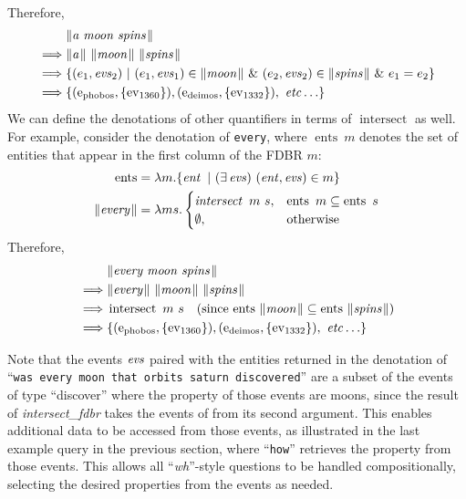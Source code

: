 \documentclass[../main.tex]{subfiles}
\begin{document}
\begin{refsection}
\begin{equation*}
\begin{split}
	\end{split}
\end{equation*}
Therefore,
\begin{equation*}
	\begin{split}
		&\meaningof{a\ moon\ spins} \\
		\implies & \meaningof{a}\ \meaningof{moon}\ \meaningof{spins} \\
		\implies & \{(e_1,\evs_2)\ |\ (e_1,\evs_1) \in \meaningof{moon}\ \&\ (e_2,\evs_2) \in \meaningof{spins}\ \&\ e_1 = e_2\} \\
		\implies & \{(\entityassoc{phobos}, \{\eventassoc{1360}\}), (\entityassoc{deimos}, \{\eventassoc{1332}\}),\ \etc\}
	\end{split}
\end{equation*}
We can define the denotations of other quantifiers in terms of $\operatorname{intersect}$ as well.  For example, consider the denotation of \texttt{every}, where $\operatorname{ents}\ m$ denotes the set of entities that appear in the first column of the FDBR $m$:
\begin{equation*}
	\begin{split}
		\operatorname{ents} &= \lambda m.\{ \operatorname{\mathit{ent}}\ |\ (\exists \operatorname{\mathit{evs}})\ (\operatorname{\mathit{ent}}, \operatorname{\mathit{evs}}) \in m \} \\
		\lVert\textit{every\hspace{0.1em}}\rVert &= \lambda ms.
		\begin{cases}
			\operatorname{\mathit{intersect}}\ m\ s, & \operatorname{ents}\ m \subseteq \operatorname{ents}\ s \\
			\emptyset, & \text{otherwise}
		\end{cases}
	\end{split}
\end{equation*}
Therefore,
\begin{equation*}
	\begin{split}
		&\meaningof{every moon spins} \\
		\implies & \meaningof{every}\ \meaningof{moon}\ \meaningof{spins} \\
		\implies & \operatorname{intersect}\ m\ s\quad\dmathrm{(since $\operatorname{ents}\ \meaningof{moon} \subseteq \operatorname{ents}\ \meaningof{spins}$)} \\
		\implies & \{(\entityassoc{phobos}, \{\eventassoc{1360}\}), (\entityassoc{deimos}, \{\eventassoc{1332}\}),\ \etc\}
	\end{split}
\end{equation*}

\noindent Note that the events $\operatorname{\mathit{evs}}$ paired with the entities returned in the denotation of ``\texttt{was every moon that orbits saturn discovered}'' are a subset of the events of type ``discover'' where the  property of those events are moons, since the result of \textit{intersect\_fdbr} takes the events of from its second argument. This enables additional data to be accessed from those events, as illustrated in the last example query in the previous section, where ``\texttt{how}'' retrieves the  property from those events.  This allows all ``\textit{wh}''-style questions to be handled compositionally, selecting the desired properties from the events as needed.


\end{refsection}
\end{document}
